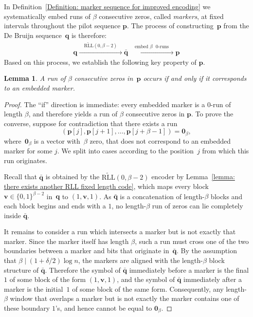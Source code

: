 \documentclass[journal,letterpaper,onecolumn,11pt]{IEEEtran}
\newcommand{\boldp}{\mathbf{p}}
\newcommand{\boldq}{\mathbf{q}}
\newcommand{\boldv}{\mathbf{v}}
\newtheorem{lemma}{Lemma}
\begin{document}
In Definition~\ref{Definition: marker sequence for improved encoding} we systematically embed runs of $\beta$ consecutive zeros, called \textit{markers}, at fixed intervals throughout the pilot sequence $\mathbf{p}$. 
The process of constructing~$\boldp$ from the De Bruijn sequence~$\boldq$ is therefore:
\begin{align}\label{equation:pilot,debruijn and modified de bruijn}
\boldq
\xrightarrow{\quad \widetilde{\text{RLL}}(0,\beta-2) \quad}
\bar{\boldq}
\xrightarrow{\quad \text{embed~$\beta$ $0$-runs} \quad}
\boldp
\end{align}
Based on this process, we establish the following key property of $\mathbf{p}$.
\begin{lemma}\label{lemma:a run of consecutive zeros occurs}
A run of $\beta$ consecutive zeros in~$\boldp$ occurs if and only if it corresponds to an embedded marker.
\end{lemma}
\begin{proof}
The ``if'' direction is immediate: every embedded marker is a $0$-run of length $\beta$, and therefore yields a run of $\beta$ consecutive zeros in $\boldp$.
To prove the converse, suppose for contradiction that there exists a run
\[
    (\boldp[j] , \boldp[j+1] , \ldots , \boldp[j+\beta-1])
    =
    \mathbf{0}_\beta,
\]
where~$\mathbf{0}_\beta$ is a vector with~$\beta$ zero, that does not correspond to an embedded marker for some $j$.
We split into cases according to the position~$j$ from which this run originates.

Recall that $\bar{\boldq}$ is obtained by the
$\widetilde{\mathrm{RLL}}(0,\beta-2)$ encoder by Lemma~\ref{lemma: there exists another RLL fixed length code}, which maps every block
$\boldv\in\{0,1\}^{\beta-2}$ in~$\boldq$ to $(1, \boldv ,1)$.
As $\bar{\boldq}$ is a concatenation of length-$\beta$ blocks and each block begins and ends with a $1$, no length-$\beta$ run of zeros can lie completely inside $\bar{\boldq}$.

It remains to consider a run which intersects a marker but is not exactly that marker. 
Since the marker itself has length $\beta$, such a run must cross one of the two boundaries between a marker and bits that originate in~$\bar{\boldq}$. 
By the assumption that $\beta \mid (1+\delta/2)\log n$, the markers are aligned with the length-$\beta$ block structure of $\bar{\boldq}$. 
Therefore the symbol of $\bar{\boldq}$ immediately before a marker is the final $1$ of some block of the form
$(1,\boldv, 1)$, and the symbol of $\bar{\boldq}$ immediately after a marker is the initial~$1$ of some block of the same form.
Consequently, any length-$\beta$ window that overlaps a marker but is not exactly the marker contains one of these boundary $1$'s, and hence cannot be equal to $\mathbf{0}_\beta$.
\end{proof}
\end{document}
